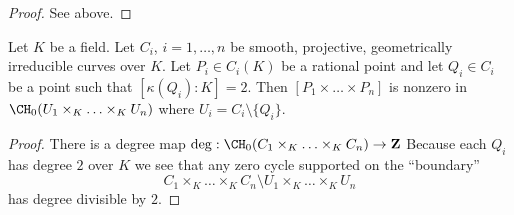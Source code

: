 \begin{proof}
See above.
\end{proof}

\begin{lemma}
\label{lemma-chow-group-product}
Let $K$ be a field.
Let $C_i$, $i = 1, \ldots, n$ be smooth, projective, geometrically irreducible
curves over $K$. Let $P_i \in C_i(K)$ be a rational point and
let $Q_i \in C_i$ be a point such that $[\kappa(Q_i) : K] = 2$.
Then $[P_1 \times \ldots \times P_n]$ is nonzero in
$\CH_0(U_1 \times_K \ldots \times_K U_n)$ where $U_i = C_i \setminus \{Q_i\}$.
\end{lemma}

\begin{proof}
There is a degree map
$\deg : \CH_0(C_1 \times_K \ldots \times_K C_n) \to \mathbf{Z}$
Because each $Q_i$ has degree $2$ over $K$ we see that
any zero cycle supported on the ``boundary''
$$
C_1 \times_K \ldots \times_K C_n
\setminus
U_1 \times_K \ldots \times_K U_n
$$
has degree divisible by $2$.
\end{proof}

